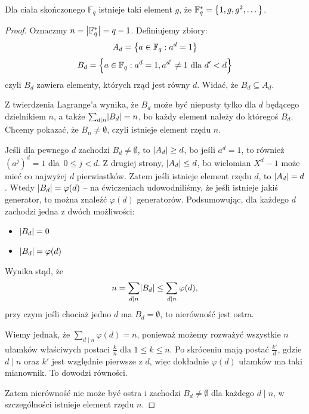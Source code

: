 \begin{theorem}
Dla ciała skończonego \( \mathbb{F}_q \) istnieje taki element \( g \), że \( \mathbb{F}^{*}_q = \set{1, g, g^2, \text{\dots}} \).
\end{theorem}
\begin{proof}
    Oznaczmy \( n = \left\lvert\mathbb{F}^{*}_q\right\rvert = q-1 \). Definiujemy zbiory:
    \[
        A_d = \set{a \in \mathbb{F}_q : a^d = 1}
    \]
    \[
        B_d = \set{a \in \mathbb{F}_q : a^d = 1, a^{d'} \neq 1 \text{ dla } d' < d}
    \]
    czyli \( B_d \) zawiera elementy, których rząd jest równy \( d \). Widać, że \( B_d \subseteq A_d \).

    Z twierdzenia Lagrange'a wynika, że \( B_d \) może być niepusty tylko dla \( d \) będącego dzielnikiem \( n \), a także \( \sum_{d \mid n} \abs{B_d} = n \), bo każdy element należy do któregoś \( B_d \). Chcemy pokazać, że \( B_n \neq \emptyset \), czyli istnieje element rzędu \( n \).

    Jeśli dla pewnego \( d \) zachodzi \( B_d \neq \emptyset \), to \( \left\lvert A_d\right\rvert \geq d \), bo jeśli \( a^d = 1 \), to również \( (a^j)^d = 1 \) dla~\( 0 \leq j < d \). Z drugiej strony, \( \left\lvert A_d\right\rvert \leq d \), bo wielomian \( X^d-1 \) może mieć co najwyżej \( d \) pierwiastków. Zatem jeśli istnieje element rzędu \( d \), to \( \left\lvert A_d\right\rvert = d \).
    Wtedy \( \left\lvert B_d\right\rvert = \varphi(d) \) -- na ćwiczeniach udowodniliśmy, że jeśli istnieje jakiś generator, to można znaleźć \( \varphi(d) \) generatorów.
    Podsumowując, dla każdego \( d \) zachodzi jedna z dwóch możliwości:
    \begin{itemize}
        \item \( \left\lvert B_d\right\rvert = 0 \)
        \item \( \left\lvert B_d\right\rvert = \varphi(d) \)
    \end{itemize}
    Wynika stąd, że
    \[
        n = \sum_{d \mid n} \abs{B_d} \leq \sum_{d \mid n} \varphi(d), 
    \]
    przy czym jeśli chociaż jedno \( d \) ma \( B_d = \emptyset \), to nierówność jest ostra.
    
    Wiemy jednak, że \( \sum_{d \mid n} \varphi(d) = n \), ponieważ możemy rozważyć wszystkie \( n \) ułamków właściwych postaci \( \frac{k}{n} \) dla \( 1 \leq k \leq n \).
    Po skróceniu mają postać \( \frac{k'}{d} \), gdzie \( d \mid n \) oraz \( k' \) jest względnie pierwsze z \( d \), więc dokładnie \( \varphi(d) \) ułamków ma taki mianownik. To dowodzi równości.

    Zatem nierówność nie może być ostra i zachodzi \( B_d \neq \emptyset \) dla każdego \( d \mid n \), w szczególności istnieje element rzędu \( n \).
\end{proof}
